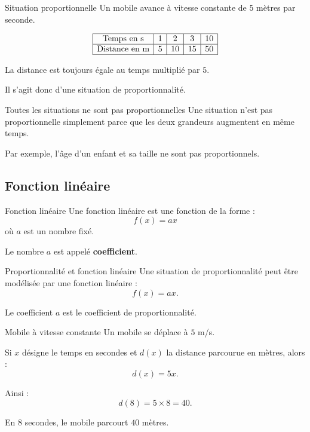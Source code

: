 \documentclass[11pt,a4paper]{article}
\begin{document}
\begin{examplebox}{Situation proportionnelle}
Un mobile avance à vitesse constante de $5$ mètres par seconde.

\[
\begin{array}{|c|c|c|c|c|}
\hline
\text{Temps en s} & 1 & 2 & 3 & 10 \\
\hline
\text{Distance en m} & 5 & 10 & 15 & 50 \\
\hline
\end{array}
\]

La distance est toujours égale au temps multiplié par $5$.

Il s'agit donc d'une situation de proportionnalité.
\end{examplebox}

\begin{warningbox}{Toutes les situations ne sont pas proportionnelles}
Une situation n'est pas proportionnelle simplement parce que les deux grandeurs augmentent en même temps.

Par exemple, l'âge d'un enfant et sa taille ne sont pas proportionnels.
\end{warningbox}

\subsection{Fonction linéaire}

\begin{definitionbox}{Fonction linéaire}
Une fonction linéaire est une fonction de la forme :
\[
f(x)=ax
\]
où $a$ est un nombre fixé.

Le nombre $a$ est appelé \textbf{coefficient}.
\end{definitionbox}

\begin{propositionbox}{Proportionnalité et fonction linéaire}
Une situation de proportionnalité peut être modélisée par une fonction linéaire :
\[
f(x)=ax.
\]

Le coefficient $a$ est le coefficient de proportionnalité.
\end{propositionbox}

\begin{examplebox}{Mobile à vitesse constante}
Un mobile se déplace à $5$ m/s.

Si $x$ désigne le temps en secondes et $d(x)$ la distance parcourue en mètres, alors :
\[
d(x)=5x.
\]

Ainsi :
\[
d(8)=5\times 8=40.
\]

En $8$ secondes, le mobile parcourt $40$ mètres.
\end{examplebox}
\end{document}
